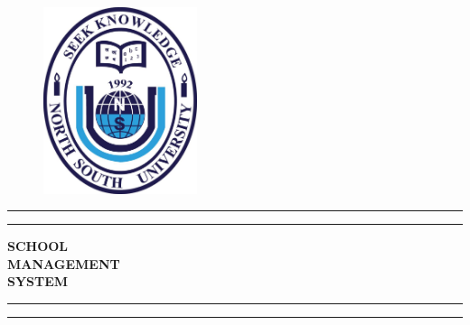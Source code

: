\documentclass[a4paper,12pt]{article}
\begin{document}
\begin{figure}
    \centering
\includegraphics[width=4.5cm]{logo.jpg}    
\end{figure}

\begin{titlepage} %

	\centering %
	
	\scshape %
	
	\vspace*{\baselineskip} %
	
	
	\rule{\textwidth}{1.6pt}\vspace*{-\baselineskip}\vspace*{2pt} %
	\rule{\textwidth}{0.4pt} %
	
	\vspace{0.75\baselineskip} %
	
	{\Large \textbf{SCHOOL\\ MANAGEMENT \\ \vspace{0.25cm} SYSTEM}   } %
	
	\vspace{0.75\baselineskip} %
	
	\rule{\textwidth}{0.4pt}\vspace*{-\baselineskip}\vspace{3.2pt} %
	\rule{\textwidth}{1.6pt} %
	
	\vspace{2\baselineskip} %
	
	

\end{titlepage}
\end{document}
